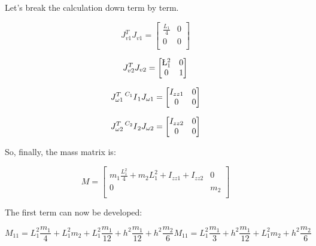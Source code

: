\documentclass{exam}
\begin{document}
\begin{questions}
\begin{parts}
Let's break the calculation down term by term.

\begin{equation}
  J_{v1}^T J_{v1} = \begin{bmatrix}
    \frac{L_1}{4} & 0 \\
    0             & 0 \\
                    \end{bmatrix}
\end{equation}

\begin{equation}
  J_{v2}^T J_{v2} = \begin{bmatrix}
    \L_1^2 & 0 \\
    0      & 1 \\
                    \end{bmatrix}
\end{equation}

\begin{equation}
  J_{\omega1}^T \prescript{C_1}{}I_1 J_{\omega1} =
    \begin{bmatrix}
      I_{zz1} & 0 \\
      0       & 0 \\
    \end{bmatrix}
\end{equation}

\begin{equation}
  J_{\omega2}^T \prescript{C_2}{}I_2 J_{\omega2} =
    \begin{bmatrix}
      I_{zz2} & 0 \\
      0       & 0 \\
    \end{bmatrix}
\end{equation}

So, finally, the mass matrix is:

\begin{equation}
  M = \begin{bmatrix}
    m_1\frac{L_1^2}{4} + m_{2}L_1^2 + I_{zz1} + I_{zz2} & 0   \\
    0                                                   & m_2 \\
      \end{bmatrix}
\end{equation}

The first term can now be developed:

\begin{subequations}
  \begin{equation}
    M_{11} = L_1^2\frac{m_1}{4} + L_1^2m_2 + L_1^2\frac{m_1}{12} +
             h^2\frac{m_1}{12} + h^2\frac{m_2}{6}
  \end{equation}
  \begin{equation}
    M_{11} = L_1^2\frac{m_1}{3} + h^2\frac{m_1}{12} + L_1^2m_2 + 
             h^2\frac{m_2}{6}
  \end{equation}
\end{subequations}


\end{parts}
\end{questions}
\end{document}
